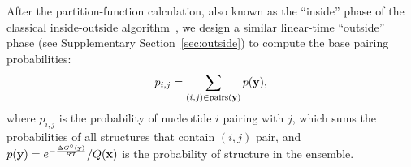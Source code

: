 After the partition-function calculation, also known as the ``inside'' phase of the classical inside-outside algorithm~\cite{baker:1979},
we design a similar linear-time ``outside'' phase (see Supplementary Section~\ref{sec:outside})
to compute the base pairing probabilities:
\vspace{-0.1cm}
\[
p_{i,j} = \sum_{(i,j)\in \text{pairs}(\mathbf{y})} p(\mathbf{y}),
\]
where $p_{i,j}$ is the probability of nucleotide $i$ pairing with $j$,
which sums the probabilities of all structures that contain $(i,j)$ pair,
and $p(\mathbf{y})=e^{-\frac{\Delta G^\circ(\mathbf{y})}{RT}} / Q(\mathbf{x})$
is the probability of structure \vecy %
in the ensemble.  %



